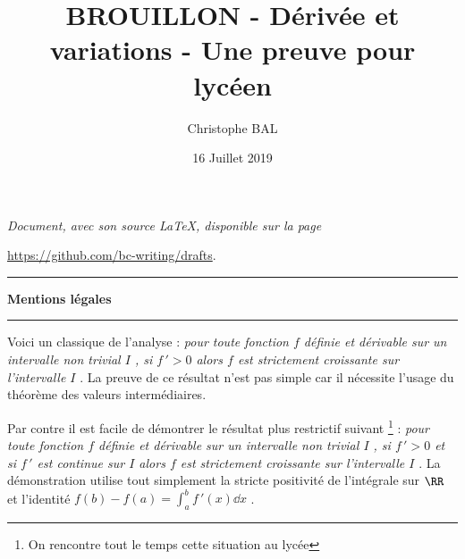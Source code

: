 \documentclass[12pt]{amsart}
\begin{document}
\title{BROUILLON - Dérivée et variations - Une preuve pour lycéen}
\author{Christophe BAL}
\date{16 Juillet 2019}

\maketitle

\begin{center}
	\itshape
	Document, avec son source \LaTeX, disponible sur la page
	
	\url{https://github.com/bc-writing/drafts}.
\end{center}


\bigskip


\begin{center}
	\hrule\vspace{.3em}
	{
		\fontsize{1.35em}{1em}\selectfont
		\textbf{Mentions \og légales \fg}
	}
			
	\vspace{0.45em}
	\doclicenseThis
	\hrule
\end{center}


\vspace{1em}


Voici un classique de l'analyse : \emph{\og pour toute fonction $f$ définie et dérivable sur un intervalle non trivial $I$ , si $f\,' > 0$ alors $f$ est strictement croissante sur l'intervalle $I$ \fg}. La preuve de ce résultat n'est pas simple car il nécessite l'usage du théorème des valeurs intermédiaires.


\medskip


Par contre il est facile de démontrer le résultat plus restrictif suivant
\footnote{
	On rencontre tout le temps cette situation au lycée
} :
\emph{\og pour toute fonction $f$ définie et dérivable sur un intervalle non trivial $I$ , si $f\,' > 0$ et si $f\,'$ est continue sur $I$ alors $f$ est strictement croissante sur l'intervalle $I$ \fg}. 
La démonstration utilise tout simplement la stricte positivité de l'intégrale sur $\RR$ et l'identité $f(b) - f(a) = \int_a^b f\,'(x) \dd{x}$ .
\end{document}
